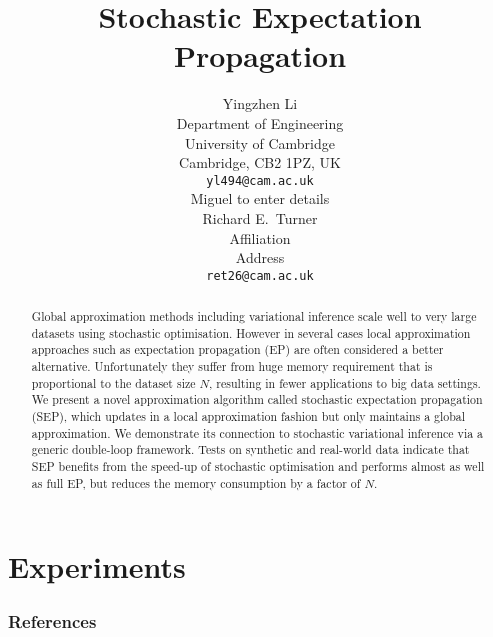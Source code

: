 \documentclass{article} %
\title{Stochastic Expectation Propagation}
\author{
Yingzhen Li \\
Department of Engineering\\
University of Cambridge\\
Cambridge, CB2 1PZ, UK \\
\texttt{yl494@cam.ac.uk} \\
\And
Miguel to enter details\\
\And
Richard E.~Turner \\
Affiliation \\
Address \\
\texttt{ret26@cam.ac.uk} \\
}
\begin{document}
\maketitle

\begin{abstract}
Global approximation methods including variational inference scale well to very large datasets using stochastic optimisation. However in several cases local approximation approaches such as expectation propagation (EP) are often considered a better alternative. Unfortunately they suffer from huge memory requirement that is proportional to the dataset size $N$, resulting in fewer applications to big data settings. We present a novel approximation algorithm called stochastic expectation propagation (SEP), which updates in a local approximation fashion but only maintains a global approximation. We demonstrate its connection to stochastic variational inference via a generic double-loop framework. Tests on synthetic and real-world data indicate that SEP benefits from the speed-up of stochastic optimisation and performs almost as well as full EP, but reduces the memory consumption by a factor of $N$. 
\end{abstract}







%

%

\section{Experiments}






\subsubsection*{References}
\renewcommand{\section}[2]{}


\end{document}
